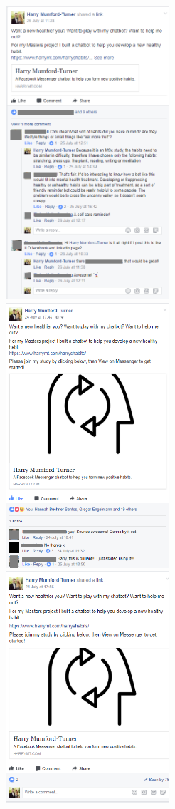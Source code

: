 
\begin{figure}[H]
  \centering
  \includegraphics[width=2.4in]{resources/feedback/adverts/css-post.png}
  \hspace{10px}
  \includegraphics[width=2.4in]{resources/feedback/adverts/public-post.png}
  \hspace{10px}
  \includegraphics[width=2.4in]{resources/feedback/adverts/msc-post.png}

\end{figure}
